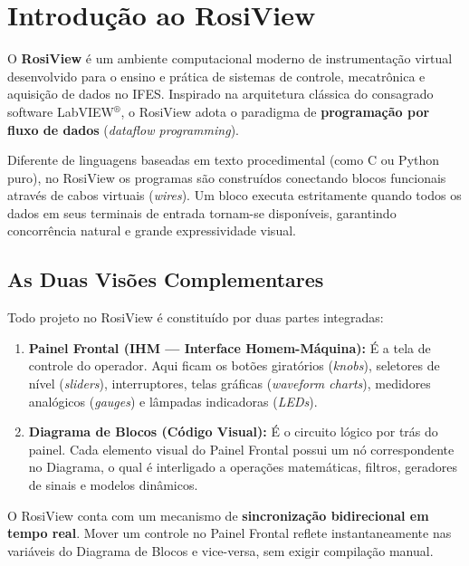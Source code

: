 \documentclass[11pt,a4paper]{article}
\begin{document}
\section{Introdução ao RosiView}

O \textbf{RosiView} é um ambiente computacional moderno de instrumentação virtual desenvolvido para o ensino e prática de sistemas de controle, mecatrônica e aquisição de dados no IFES. Inspirado na arquitetura clássica do consagrado software LabVIEW$^\circledR$, o RosiView adota o paradigma de \textbf{programação por fluxo de dados} (\textit{dataflow programming}).

Diferente de linguagens baseadas em texto procedimental (como C ou Python puro), no RosiView os programas são construídos conectando blocos funcionais através de cabos virtuais (\textit{wires}). Um bloco executa estritamente quando todos os dados em seus terminais de entrada tornam-se disponíveis, garantindo concorrência natural e grande expressividade visual.

\subsection{As Duas Visões Complementares}
Todo projeto no RosiView é constituído por duas partes integradas:
\begin{enumerate}[leftmargin=*]
    \item \textbf{Painel Frontal (IHM --- Interface Homem-Máquina):} É a tela de controle do operador. Aqui ficam os botões giratórios (\textit{knobs}), seletores de nível (\textit{sliders}), interruptores, telas gráficas (\textit{waveform charts}), medidores analógicos (\textit{gauges}) e lâmpadas indicadoras (\textit{LEDs}).
    \item \textbf{Diagrama de Blocos (Código Visual):} É o circuito lógico por trás do painel. Cada elemento visual do Painel Frontal possui um nó correspondente no Diagrama, o qual é interligado a operações matemáticas, filtros, geradores de sinais e modelos dinâmicos.
\end{enumerate}

\begin{destaque}
    O RosiView conta com um mecanismo de \textbf{sincronização bidirecional em tempo real}. Mover um controle no Painel Frontal reflete instantaneamente nas variáveis do Diagrama de Blocos e vice-versa, sem exigir compilação manual.
\end{destaque}
\end{document}
